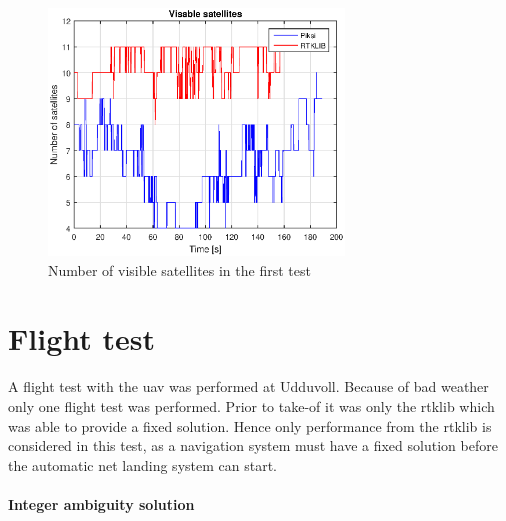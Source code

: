 \begin{figure}[H]
	\centering
		\includegraphics[width=0.7\textwidth]{figs/plots/numSatWalk2.eps}
		\caption{Number of visible satellites in the first test}
		\label{figure:numSatWalk2}
\end{figure}
\section{Flight test}
A flight test with the \gls{uav} was performed at Udduvoll. Because of bad weather only one flight test was performed. Prior to take-of it was only the \gls{rtklib} which was able to provide a fixed solution. Hence only performance from the \gls{rtklib} is considered in this test, as a navigation system must have a fixed solution before the automatic net landing system can start.

\paragraph{Integer ambiguity solution}

